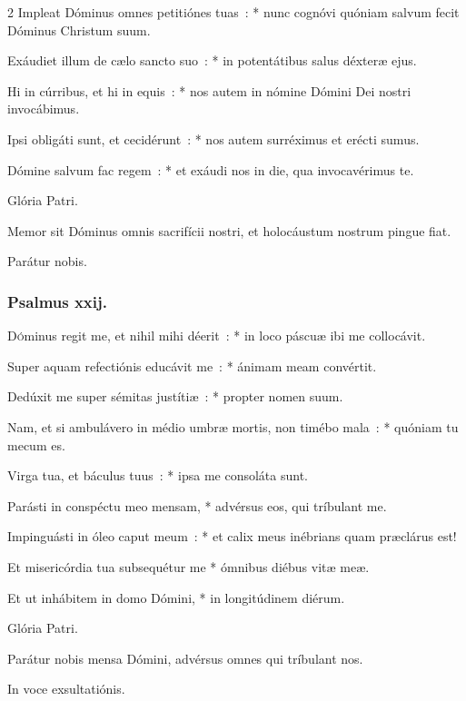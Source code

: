\documentclass[9pt,twoside]{extarticle}
\begin{document}
\begin{multicols}{2}
Impleat Dóminus omnes petitiónes tuas~: * nunc cognóvi quóniam salvum fecit Dóminus Christum suum.

Exáudiet illum de cælo sancto suo~: * in potentátibus salus déxteræ ejus.

Hi in cúrribus, et hi in equis~: * nos autem in nómine Dómini Dei nostri invocábimus.

Ipsi obligáti sunt, et cecidérunt~: * nos autem surréximus et erécti sumus.

Dómine salvum fac regem~: * et exáudi nos in die, qua invocavérimus te.

Glória Patri.

\begin{tightlist}{}
\item {} Memor sit Dóminus omnis sacrifícii nostri, et holocáustum nostrum pingue fiat.
\item {} Parátur nobis.
\end{tightlist}

\subsubsection*{\center Psalmus xxij.}
\lettrine{D}óminus regit me, et nihil mihi déerit~: * in loco páscuæ ibi me collocávit.

Super aquam refectiónis educávit me~: * ánimam meam convértit.

Dedúxit me super sémitas justítiæ~: * propter nomen suum.

Nam, et si ambulávero in médio umbræ mortis, non timébo mala~: * quóniam tu mecum es.

Virga tua, et báculus tuus~: * ipsa me consoláta sunt.

Parásti in conspéctu meo mensam, * advérsus eos, qui tríbulant me.

Impinguásti in óleo caput meum~: * et calix meus inébrians quam præclárus est!

Et misericórdia tua subsequétur me * ómnibus diébus vitæ meæ.

Et ut inhábitem in domo Dómini, * in longitúdinem diérum.

Glória Patri.

\begin{tightlist}{}
\item {} Parátur nobis mensa Dómini, advérsus omnes qui tríbulant nos.
\item {} In voce exsultatiónis.
\end{tightlist}


\end{multicols}
\end{document}
